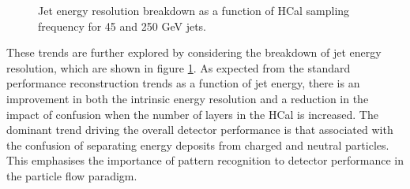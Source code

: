 \begin{figure}
\centering
{}
\caption[Jet energy resolution breakdown as a function of HCal sampling frequency for 45 and 250 GeV jets.]{Jet energy resolution breakdown as a function of HCal sampling frequency for 45 and 250 GeV jets.}
\label{fig:hcalnlayersbreak}
\end{figure}

These trends are further explored by considering the breakdown of jet energy resolution, which are shown in figure \ref{fig:hcalnlayersbreak}.  As expected from the standard performance reconstruction trends as a function of jet energy, there is an improvement in both the intrinsic energy resolution and a reduction in the impact of confusion when the number of layers in the HCal is increased.  The dominant trend driving the overall detector performance is that associated with the confusion of separating energy deposits from charged and neutral particles.  This emphasises the importance of pattern recognition to detector performance in the particle flow paradigm.    

